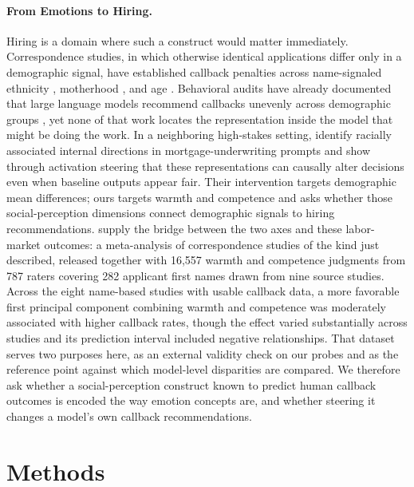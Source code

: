 \documentclass[twocolumn]{article}
\begin{document}
\paragraph{From Emotions to Hiring.}
Hiring is a domain where such a construct would matter immediately.
Correspondence studies, in which otherwise identical applications differ
only in a demographic signal, have established callback penalties across
name-signaled ethnicity \citep{bertrand2004emily, oreopoulos2011why},
motherhood \citep{correll2007getting}, and age
\citep{neumark2019older}.
Behavioral audits have already documented that large language models
recommend callbacks unevenly across demographic groups
\citep{an2024llm, an_measuring_2025, gaebler2024auditing}, yet none of that
work locates the representation inside the model that might be doing the
work.
In a neighboring high-stakes setting, \citet{tripathy2026fair} identify
racially associated internal directions in mortgage-underwriting prompts and
show through activation steering that these representations can causally
alter decisions even when baseline outputs appear fair. Their intervention
targets demographic mean differences; ours targets warmth and competence and
asks whether those social-perception dimensions connect demographic signals
to hiring recommendations.
\citet{gallo2024warmth} supply the bridge between the two axes and these
labor-market outcomes: a meta-analysis of correspondence studies of the kind
just described, released together with 16,557 warmth and competence
judgments from 787 raters covering 282 applicant first names drawn from nine
source studies.
Across the eight name-based studies with usable callback data, a more
favorable first principal component combining warmth and competence was
moderately associated with higher callback rates, though the effect varied
substantially across studies and its prediction interval included negative
relationships.
That dataset serves two purposes here, as an external validity check on our
probes and as the reference point against which model-level disparities are
compared.
We therefore ask whether a social-perception construct known to predict
human callback outcomes is encoded the way emotion concepts are, and whether
steering it changes a model's own callback recommendations.

\section*{Methods}
\end{document}
